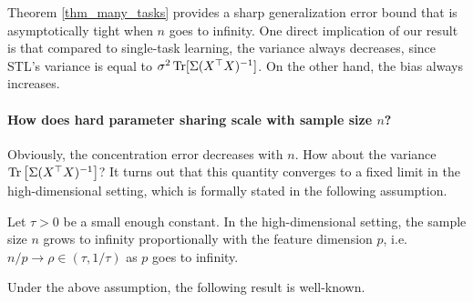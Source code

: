 Theorem \ref{thm_many_tasks} provides a sharp generalization error bound that is asymptotically tight when $n$ goes to infinity.
One direct implication of our result is that compared to single-task learning, the variance always decreases, since STL's variance is equal to $\sigma^2 \operatorname{Tr}[\Sigma (X^{\top} X)^{-1}]$.
On the other hand, the bias always increases.


\paragraph{How does hard parameter sharing scale with sample size $n$?}
Obviously, the concentration error decreases with $n$.
How about the variance $\operatorname{Tr}\left[\Sigma (X^{\top} X)^{-1}\right]$?
It turns out that this quantity converges to a fixed limit in the high-dimensional setting, which is formally stated in the following assumption.

\begin{assumption}\label{assume_rm}
	Let $\tau > 0$ be a small enough constant.
	In the high-dimensional setting,
  the sample size $n$ grows to infinity proportionally with the feature dimension $p$, i.e. $n / p \rightarrow \rho \in (\tau, 1/\tau)$ as $p$ goes to infinity.
\end{assumption}
Under the above assumption, the following result is well-known.

